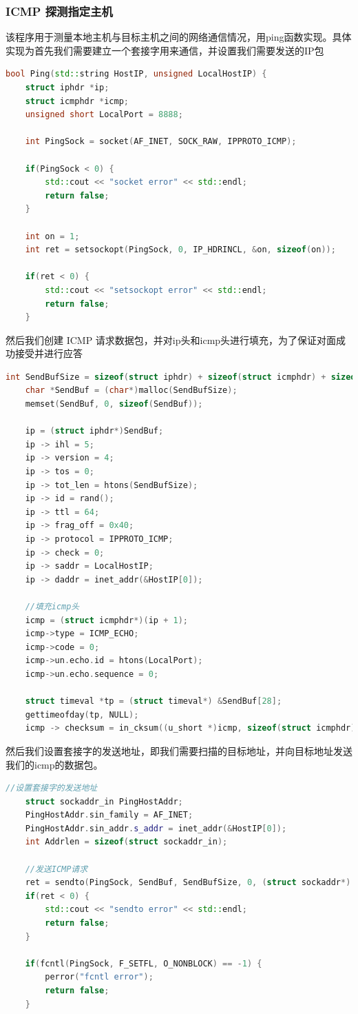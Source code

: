 \documentclass[UTF8,a4paper,10pt]{ctexart}
\begin{document}
\subsubsection{ICMP 探测指定主机}
该程序用于测量本地主机与目标主机之间的网络通信情况，用ping函数实现。具体实现为首先我们需要建立一个套接字用来通信，并设置我们需要发送的IP包
\begin{lstlisting}[language = C++]
bool Ping(std::string HostIP, unsigned LocalHostIP) {
    struct iphdr *ip; 
    struct icmphdr *icmp;
    unsigned short LocalPort = 8888;

    int PingSock = socket(AF_INET, SOCK_RAW, IPPROTO_ICMP);

    if(PingSock < 0) {
        std::cout << "socket error" << std::endl;
        return false;
    }
    
    int on = 1;
    int ret = setsockopt(PingSock, 0, IP_HDRINCL, &on, sizeof(on));

    if(ret < 0) {
        std::cout << "setsockopt error" << std::endl;
        return false;
    }
\end{lstlisting}
然后我们创建 ICMP 请求数据包，并对ip头和icmp头进行填充，为了保证对面成功接受并进行应答
\begin{lstlisting}[language = C++]
   int SendBufSize = sizeof(struct iphdr) + sizeof(struct icmphdr) + sizeof(struct timeval);
    char *SendBuf = (char*)malloc(SendBufSize);
    memset(SendBuf, 0, sizeof(SendBuf));

    ip = (struct iphdr*)SendBuf;
    ip -> ihl = 5;
    ip -> version = 4;
    ip -> tos = 0;
    ip -> tot_len = htons(SendBufSize);
    ip -> id = rand();
    ip -> ttl = 64;
    ip -> frag_off = 0x40;
    ip -> protocol = IPPROTO_ICMP;
    ip -> check = 0;
    ip -> saddr = LocalHostIP;
    ip -> daddr = inet_addr(&HostIP[0]);

    //填充icmp头
    icmp = (struct icmphdr*)(ip + 1);
    icmp->type = ICMP_ECHO;
    icmp->code = 0;
    icmp->un.echo.id = htons(LocalPort);
    icmp->un.echo.sequence = 0;

    struct timeval *tp = (struct timeval*) &SendBuf[28];
    gettimeofday(tp, NULL);
    icmp -> checksum = in_cksum((u_short *)icmp, sizeof(struct icmphdr) + sizeof(struct timeval));
\end{lstlisting}
然后我们设置套接字的发送地址，即我们需要扫描的目标地址，并向目标地址发送我们的icmp的数据包。
\begin{lstlisting}[language = C++]
   //设置套接字的发送地址
    struct sockaddr_in PingHostAddr;
    PingHostAddr.sin_family = AF_INET;
    PingHostAddr.sin_addr.s_addr = inet_addr(&HostIP[0]);
    int Addrlen = sizeof(struct sockaddr_in);

    //发送ICMP请求
    ret = sendto(PingSock, SendBuf, SendBufSize, 0, (struct sockaddr*) &PingHostAddr, sizeof(PingHostAddr));
    if(ret < 0) {
        std::cout << "sendto error" << std::endl;
        return false;
    }

    if(fcntl(PingSock, F_SETFL, O_NONBLOCK) == -1) {
        perror("fcntl error");
        return false;
    }
\end{lstlisting}
\end{document}
